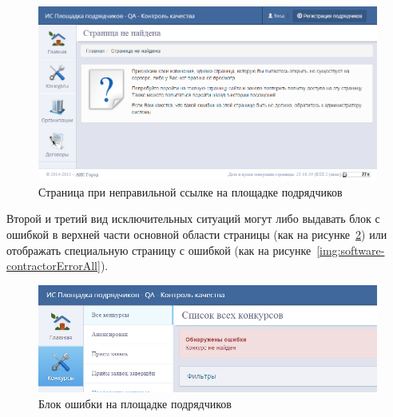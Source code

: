 \begin{figure}[h!]
	\begin{center}
		\begin{minipage}[h]{\linewidth}
			\centering
			\includegraphics[width=\linewidth]{images/software-contractorNotFound.png}
			\caption{Страница при неправильной ссылке на площадке подрядчиков}
			\label{img:software-contractorNotFound}
		\end{minipage}
		\hfill
	\end{center}
\end{figure}

Второй и третий вид исключительных ситуаций могут либо выдавать блок с ошибкой в верхней части основной области страницы (как на рисунке~\ref{img:software-contractorErrorTop}) или отображать специальную страницу с ошибкой (как на рисунке~\ref{img:software-contractorErrorAll}).

\begin{figure}[h!]
	\begin{center}
		\begin{minipage}[h]{\linewidth}
			\centering
			\includegraphics[width=\linewidth]{images/software-contractorErrorTop.png}
			\caption{Блок ошибки на площадке подрядчиков}
			\label{img:software-contractorErrorTop}
		\end{minipage}
		\hfill
	\end{center}
\end{figure}

